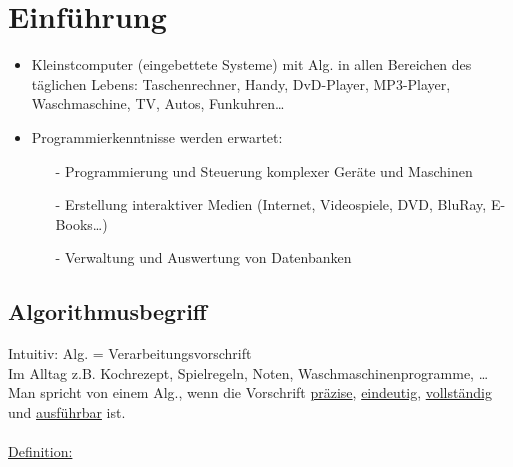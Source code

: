 \section{Einführung}

\begin{itemize}
 \item Kleinstcomputer (eingebettete Systeme) mit Alg. in allen Bereichen des täglichen Lebens: Taschenrechner, Handy, DvD-Player, MP3-Player, Waschmaschine, TV, Autos, Funkuhren\dots
 \item Programmierkenntnisse werden erwartet:
  \begin{itemize}
   \item[-] Programmierung und Steuerung komplexer Geräte und Maschinen
   \item[-] Erstellung interaktiver Medien (Internet, Videospiele, DVD, BluRay, E-Books\dots )
   \item[-] Verwaltung und Auswertung von Datenbanken
  \end{itemize}
\end{itemize}

\subsection{Algorithmusbegriff}
Intuitiv: Alg. = Verarbeitungsvorschrift \\
Im Alltag z.B. Kochrezept, Spielregeln, Noten, Waschmaschinenprogramme, \dots \\
Man spricht von einem Alg., wenn die Vorschrift \underline{präzise}, \underline{eindeutig}, \underline{vollständig} und \underline{ausführbar} ist. \\
~\\
\underline{Definition:}

